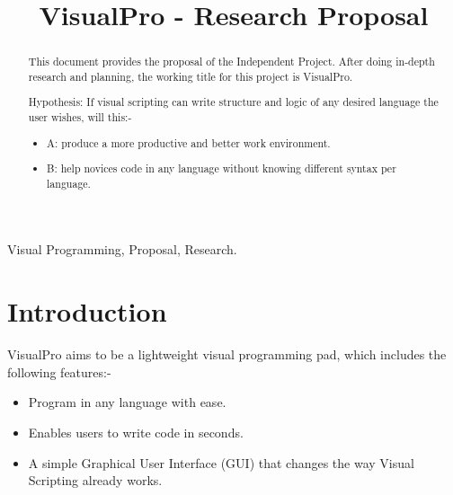 \documentclass[conference]{IEEEtran}
\begin{document}
	\title{VisualPro - Research Proposal}

	\author{
	}

     \maketitle
    
    \thispagestyle{plain}
    \pagestyle{plain}
    
    \tableofcontents
	  \vspace{.5cm}

    \begin{abstract}
    \label{abstract}
      This document provides the proposal of the Independent Project. After doing in-depth research and planning, the working title for this project is VisualPro.

      Hypothesis: If visual scripting can write structure and logic of any desired language the user wishes, will this:-
        \begin{itemize}
          \item A: produce a more productive and better work environment.
          \item B: help novices code in any language without knowing different syntax per language.
        \end{itemize}
    \end{abstract}

    \begin{IEEEkeywords}
        Visual Programming, Proposal, Research.
    \end{IEEEkeywords}

    \section{Introduction}
    \label{sec:Introduction}
      VisualPro aims to be a lightweight visual programming pad, which includes the following features:-
      \begin{itemize}
        \item Program in any language with ease.
        \item Enables users to write code in seconds.
        \item A simple Graphical User Interface (GUI) that changes the way Visual Scripting already works.
      \end{itemize}
  
\end{document}

